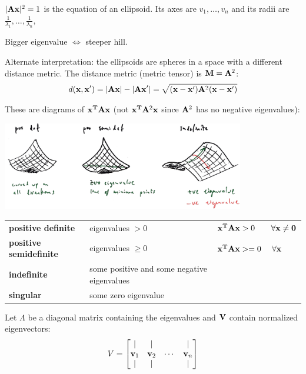 \documentclass[12pt]{article}
\begin{document}
$|\mathbf A\mathbf x|^2 = 1$ is the equation of an ellipsoid. Its axes are $v_1,\ldots,v_n$
and its radii are $\frac{1}{\lambda_1},\ldots,\frac{1}{\lambda_n},$

Bigger eigenvalue $\iff$ steeper hill.

Alternate interpretation: the ellipsoids are spheres in a space with a
different distance metric. The distance metric (metric tensor) is $\mathbf M=\mathbf A^2$:
\begin{align*}
  d(\mathbf x,\mathbf x') = |\mathbf A\mathbf x| - |\mathbf A\mathbf x'| = \sqrt{(\mathbf x - \mathbf x')\mathbf A^2(\mathbf x - \mathbf x')}
\end{align*}


\begin{minipage}{\textwidth}
These are diagrams of $\mathbf x^{\mathbf{T}}\mathbf A\mathbf x$ (not $\mathbf x^{\mathbf{T}}\mathbf A^2\mathbf x$ since $\mathbf A^2$ has no negative eigenvalues):

\includegraphics[width=300pt]{img/machine-learning-quadratic-form-eigenvectors-2.png}

\begin{tabular}{ l | l | l }
  \textbf{positive definite}     & eigenvalues $> 0$    & $\mathbf x^{\mathbf{T}}\mathbf A\mathbf x > 0 ~~~~~~ \forall \mathbf x \neq \mathbf 0$ \\
  \textbf{positive semidefinite} & eigenvalues $\geq 0$ & $\mathbf x^{\mathbf{T}}\mathbf A\mathbf x >= 0 ~~~~ \forall \mathbf x$ \\
  \textbf{indefinite}            & some positive and some negative eigenvalues & \\
  \textbf{singular}              & some zero eigenvalue \\
\end{tabular}
\end{minipage}

Let $\Lambda$ be a diagonal matrix containing the eigenvalues and $\mathbf V$ contain
normalized eigenvectors:
\begin{align*}
V = \begin{bmatrix}
\mid & \mid & & \mid \\
\mathbf v_1 & \mathbf v_2 & \cdots & \mathbf v_n\\
\mid & \mid & & \mid \\
\end{bmatrix}
\end{align*}
\end{document}
